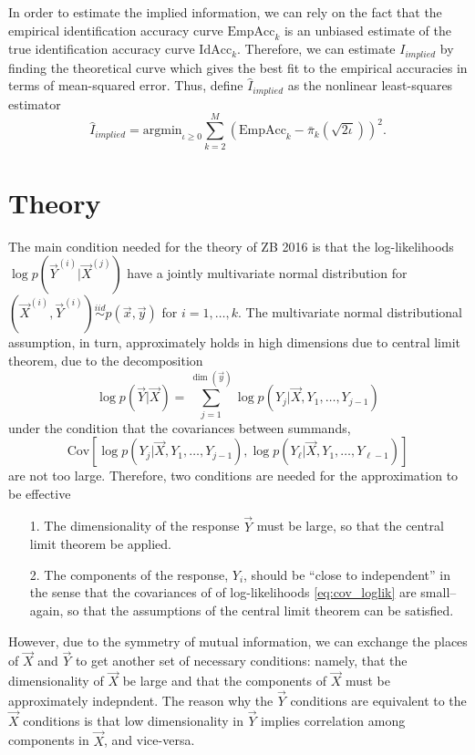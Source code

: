 \documentclass[12pt]{article}
\begin{document}
In order to estimate the implied information, we can rely on the fact that the empirical identification accuracy curve $\text{EmpAcc}_k$ is an unbiased estimate of the true identification accuracy curve $\text{IdAcc}_k$.  Therefore, we can estimate $I_{implied}$ by finding the theoretical curve which gives the best fit to the empirical accuracies in terms of mean-squared error.  Thus, define $\hat{I}_{implied}$ as the nonlinear least-squares estimator
\[
\hat{I}_{implied} = \text{argmin}_{\iota \geq 0} \sum_{k=2}^{M} (\text{EmpAcc}_k - \bar{\pi}_k(\sqrt{2 \iota}))^2.
\]

\section{Theory}

The main condition needed for the theory of ZB 2016 is that the log-likelihoods $\log p(\vec{Y}^{(i)}|\vec{X}^{(j)})$ have a jointly multivariate normal distribution for $(\vec{X}^{(i)}, \vec{Y}^{(i)}) \stackrel{iid}{\sim} p(\vec{x}, \vec{y})$ for $i = 1,\hdots, k$.  The multivariate normal distributional assumption, in turn, approximately holds in high dimensions due to central limit theorem, due to the decomposition
\[
\log p(\vec{Y}|\vec{X}) = \sum_{j=1}^{\dim(\vec{y})} \log p(Y_j | \vec{X}, Y_1,\hdots, Y_{j-1})
\]
under the condition that the covariances between summands,
\begin{equation}\label{eq:cov_loglik}
\text{Cov}[\log p(Y_j | \vec{X}, Y_1,\hdots, Y_{j-1}), \log p(Y_\ell | \vec{X}, Y_1,\hdots, Y_{\ell-1})]
\end{equation}
 are not too large.  Therefore, two conditions are needed for the approximation to be effective
\begin{itemize}
\item[1.] The dimensionality of the response $\vec{Y}$ must be large, so that the central limit theorem be applied.
\item[2.] The components of the response, $Y_i$, should be ``close to independent'' in the sense that the covariances of of log-likelihoods \eqref{eq:cov_loglik} are small--again, so that the assumptions of the central limit theorem can be satisfied.
\end{itemize}
However, due to the symmetry of mutual information, we can exchange the places of $\vec{X}$ and $\vec{Y}$ to get another set of necessary conditions: namely, that the dimensionality of $\vec{X}$ be large and that the components of $\vec{X}$ must be approximately indepndent.  The reason why the $\vec{Y}$ conditions are equivalent to the $\vec{X}$ conditions is that low dimensionality in $\vec{Y}$ implies correlation among components in $\vec{X}$, and vice-versa.
\end{document}
